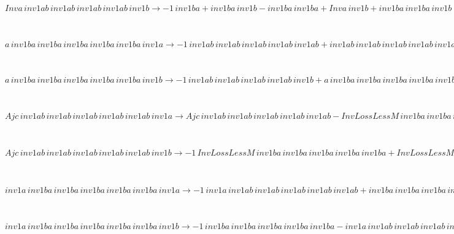 \documentclass[rep10,leqno]{report}
\begin{document}
\begin{minipage}{6in}
$
Inva\,
 inv1ab\,
 inv1ab\,
 inv1ab\,
 inv1ab\,
 inv1b\rightarrow -1\,
 inv1ba + inv1ba\,
 inv1b - inv1ba\,
 inv1ba + Inva\,
 inv1b + inv1ba\,
 inv1ba\,
 inv1b - inv1ba\,
 inv1ba\,
 inv1ba + inv1ba\,
 inv1ba\,
 inv1ba\,
 inv1b - inv1ba\,
 inv1ba\,
 inv1ba\,
 inv1ba + inv1ba\,
 inv1ba\,
 inv1ba\,
 inv1ba\,
 inv1b
$
\end{minipage}\medskip \\
\begin{minipage}{6in}
$
a\,
 inv1ba\,
 inv1ba\,
 inv1ba\,
 inv1ba\,
 inv1ba\,
 inv1a\rightarrow -1\,
 inv1ab\,
 inv1ab\,
 inv1ab\,
 inv1ab\,
 inv1ab + inv1ab\,
 inv1ab\,
 inv1ab\,
 inv1ab\,
 inv1ab\,
 inv1a
$
\end{minipage}\medskip \\
\begin{minipage}{6in}
$
a\,
 inv1ba\,
 inv1ba\,
 inv1ba\,
 inv1ba\,
 inv1ba\,
 inv1b\rightarrow -1\,
 inv1ab\,
 inv1ab\,
 inv1ab\,
 inv1ab\,
 inv1b + a\,
 inv1ba\,
 inv1ba\,
 inv1ba\,
 inv1ba\,
 inv1ba + inv1ab\,
 inv1ab\,
 inv1ab\,
 inv1ab\,
 inv1ab\,
 inv1b
$
\end{minipage}\medskip \\
\begin{minipage}{6in}
$
Ajc\,
 inv1ab\,
 inv1ab\,
 inv1ab\,
 inv1ab\,
 inv1ab\,
 inv1a\rightarrow Ajc\,
 inv1ab\,
 inv1ab\,
 inv1ab\,
 inv1ab\,
 inv1ab - InvLossLessM\,
 inv1ba\,
 inv1ba\,
 inv1ba\,
 inv1ba\,
 inv1a + InvLossLessM\,
 inv1ba\,
 inv1ba\,
 inv1ba\,
 inv1ba\,
 inv1ba\,
 inv1a
$
\end{minipage}\medskip \\
\begin{minipage}{6in}
$
Ajc\,
 inv1ab\,
 inv1ab\,
 inv1ab\,
 inv1ab\,
 inv1ab\,
 inv1b\rightarrow -1\,
 InvLossLessM\,
 inv1ba\,
 inv1ba\,
 inv1ba\,
 inv1ba\,
 inv1ba + InvLossLessM\,
 inv1ba\,
 inv1ba\,
 inv1ba\,
 inv1ba\,
 inv1ba\,
 inv1b
$
\end{minipage}\medskip \\
\begin{minipage}{6in}
$
inv1a\,
 inv1ba\,
 inv1ba\,
 inv1ba\,
 inv1ba\,
 inv1ba\,
 inv1a\rightarrow -1\,
 inv1a\,
 inv1ab\,
 inv1ab\,
 inv1ab\,
 inv1ab\,
 inv1ab + inv1ba\,
 inv1ba\,
 inv1ba\,
 inv1ba\,
 inv1ba\,
 inv1a + inv1a\,
 inv1ab\,
 inv1ab\,
 inv1ab\,
 inv1ab\,
 inv1ab\,
 inv1a
$
\end{minipage}\medskip \\
\begin{minipage}{6in}
$
inv1a\,
 inv1ba\,
 inv1ba\,
 inv1ba\,
 inv1ba\,
 inv1ba\,
 inv1b\rightarrow -1\,
 inv1ba\,
 inv1ba\,
 inv1ba\,
 inv1ba\,
 inv1ba - inv1a\,
 inv1ab\,
 inv1ab\,
 inv1ab\,
 inv1ab\,
 inv1b + inv1a\,
 inv1ba\,
 inv1ba\,
 inv1ba\,
 inv1ba\,
 inv1ba + inv1ba\,
 inv1ba\,
 inv1ba\,
 inv1ba\,
 inv1ba\,
 inv1b + inv1a\,
 inv1ab\,
 inv1ab\,
 inv1ab\,
 inv1ab\,
 inv1ab\,
 inv1b
$
\end{minipage}\medskip \\
\end{document}
